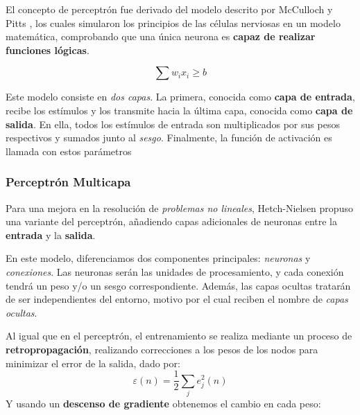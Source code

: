 El concepto de perceptrón fue derivado del modelo descrito por McCulloch y Pitts \cite{McCulloh1943ANets}, los cuales simularon los principios de las células nerviosas en un modelo matemática, comprobando que una única neurona es \textbf{capaz de realizar funciones lógicas}.

\begin{equation}
\sum w_{i}x_{i} \ge b
\end{equation}

Este modelo consiste en \textit{dos capas}. La primera, conocida como \textbf{capa de entrada}, recibe los estímulos y los transmite hacia la última capa, conocida como \textbf{capa de salida}. En ella, todos los estímulos de entrada son multiplicados por sus pesos respectivos y sumados junto al \textit{sesgo}. Finalmente, la función de activación es llamada con estos parámetros 


\subsubsection{Perceptrón Multicapa}

Para una mejora en la resolución de \textit{problemas no lineales}, Hetch-Nielsen propuso una variante del perceptrón, añadiendo capas adicionales de neuronas entre la \textbf{entrada} y la \textbf{salida}\cite{Hecht-Nielsen1989Neurocomputing}.


En este modelo, diferenciamos dos componentes principales: \textit{neuronas} y \textit{conexiones}. Las neuronas serán las unidades de procesamiento, y cada conexión tendrá un peso y/o un sesgo correspondiente. Además, las capas ocultas tratarán de ser independientes del entorno, motivo por el cual reciben el nombre de \textit{capas ocultas}.

Al igual que en el perceptrón, el entrenamiento se realiza mediante un proceso de \textbf{retropropagación}, realizando correcciones a los pesos de los nodos para minimizar el error de la salida, dado por\cite{Haykin1998NeuralFoundation}:
\begin{equation}
    \varepsilon (n) = \frac{1}{2}\sum_{j}e_{j}^2(n)
\end{equation}
Y usando un \textbf{descenso de gradiente} obtenemos el cambio en cada peso\cite{Haykin1998NeuralFoundation}:

